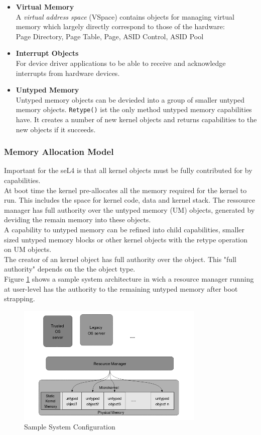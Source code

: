 \documentclass[pdftex,12pt,a4paper]{article}
\begin{document}
\begin{itemize}
	\item \textbf{Virtual Memory}\\
	A \textit{virtual address space} (VSpace) contains objects for managing virtual memory which largely directly correspond to those of the hardware: \\
	Page Directory, Page Table, Page, ASID Control, ASID Pool
	\item \textbf{Interrupt Objects} \\
	For device driver applications to be able to receive and acknowledge interrupts from hardware devices.
	\item \textbf{Untyped Memory} \\
	Untyped memory objects can be devieded into a group of smaller untyped memory objects. \texttt{Retype()} ist the only method untyped memory capabilities have. It creates a number of new kernel objects and returns capabilities to the new objects if it succeeds. 
	\end{itemize}
	
	\newpage
	\subsubsection{Memory Allocation Model}
	Important for the seL4 is that all kernel objects must be fully contributed for by capabilities. \\
	At boot time the kernel pre-allocates all the memory required for the kernel to run. This includes the space for kernel code, data and kernel stack. The ressource manager has full authority over the untyped memory (UM) objects, generated by deviding the remain memory into these objects. \\
	A capability to untyped memory can be refined into child capabilities, smaller sized untyped memory blocks or other kernel objects with the retype operation on UM objects. \\
	The creator of an kernel object has full authority over the object. This "full authority" depends on the the object type. \\
	Figure \ref{fig:systarch} shows a sample system architecture in wich a resource manager running at user-level  has the authority to the remaining untyped memory after boot strapping. 
	
	\begin{figure}[ht]
	\centering
		\includegraphics[width=0.8\textwidth]{./MemoryAllocation.png}
	\caption[Sample system architecture]{Sample System Configuration \citep{TakeG}}
	\label{fig:systarch}
	\end{figure}	
	
\end{document}
